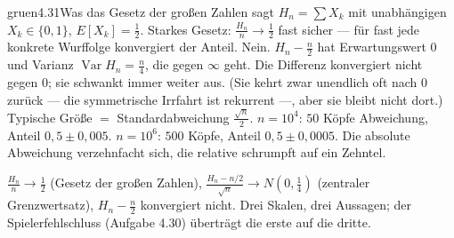 \begin{loesungkarte}{gruen}{4.31}{Was das Gesetz der großen Zahlen sagt}
$H_n = \sum X_k$ mit unabhängigen $X_k\in\{0, 1\}$, $E[X_k] = \frac12$. Starkes Gesetz: $\frac{H_n}n\to\frac12$ fast sicher --- für fast jede konkrete Wurffolge konvergiert der Anteil.
Nein. $H_n - \frac n2$ hat Erwartungswert $0$ und Varianz $\operatorname{Var}H_n = \frac n4$, die gegen $\infty$ geht. Die Differenz konvergiert nicht gegen $0$; sie schwankt immer weiter aus. (Sie kehrt zwar unendlich oft nach $0$ zurück --- die symmetrische Irrfahrt ist rekurrent ---, aber sie bleibt nicht dort.)
Typische Größe $=$ Standardabweichung $\frac{\sqrt n}2$. $n = 10^{4}$: $50$ Köpfe Abweichung, Anteil $0{,}5\pm0{,}005$. $n = 10^{6}$: $500$ Köpfe, Anteil $0{,}5\pm0{,}0005$. Die absolute Abweichung verzehnfacht sich, die relative schrumpft auf ein Zehntel.
\begin{mitnehmen}\kastentext
$\frac{H_n}n\to\frac12$ (Gesetz der großen Zahlen), $\frac{H_n - n/2}{\sqrt n}\to N(0, \frac14)$ (zentraler Grenzwertsatz), $H_n - \frac n2$ konvergiert nicht. Drei Skalen, drei Aussagen; der Spielerfehlschluss (Aufgabe 4.30) überträgt die erste auf die dritte.
\end{mitnehmen}
\end{loesungkarte}

